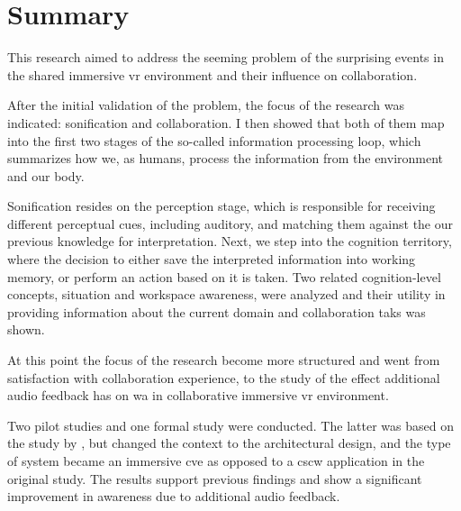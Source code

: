 
\chapter{Summary}

This research aimed to address the seeming problem of the surprising events in the shared immersive \gls{vr} environment and their influence on collaboration.

After the initial validation of the problem, the focus of the research was indicated: sonification and collaboration. I then showed that both of them map into the first two stages of the so-called information processing loop, which summarizes how we, as humans, process the information from the environment and our body.

Sonification resides on the perception stage, which is responsible for receiving different perceptual cues, including auditory, and matching them against the our previous knowledge for interpretation.
Next, we step into the cognition territory, where the decision to either save the interpreted information into working memory, or perform an action based on it is taken. 
Two related cognition-level concepts, situation and workspace awareness, were analyzed and their utility in providing information about the current domain and collaboration taks was shown.

At this point the focus of the research become more structured and went from satisfaction with collaboration experience, to the study of the effect additional audio feedback has on \gls{wa} in collaborative immersive \gls{vr} environment.

Two pilot studies and one formal study were conducted. The latter was based on the study by \cite{gutwin_chalk_2011}, but changed the context to the architectural design, and the type of system became an immersive \gls{cve} as opposed to a \gls{cscw} application in the original study. The results support previous findings and show a significant improvement in awareness due to additional audio feedback.

 






